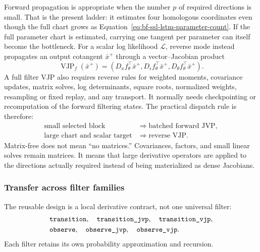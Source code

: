 Forward propagation is appropriate when the number $p$ of required
directions is small.  That is the present ladder: it estimates four homologous
coordinates even though the full chart grows as
Equation~\eqref{eq:bf-ssl-lstm-parameter-count}.  If the full parameter chart
is estimated, carrying one tangent per parameter can itself become the
bottleneck.  For a scalar log likelihood $\mathcal L$, reverse mode instead
propagates an output cotangent $\bar x^+$ through a vector--Jacobian product
\begin{equation}
  \operatorname{VJP}_{f}(\bar x^+)
  =\left(
     D_xf_\theta^\top\bar x^+,
     D_\epsilon f_\theta^\top\bar x^+,
     D_\theta f_\theta^\top\bar x^+
   \right).
  \label{eq:bf-ssl-lstm-transition-vjp}
\end{equation}
A full filter VJP also requires reverse rules for weighted moments, covariance
updates, matrix solves, log determinants, square roots, normalized weights,
resampling or fixed replay, and any transport.  It normally needs
checkpointing or recomputation of the forward filtering states.  The practical
dispatch rule is therefore:
\begin{equation}
  \begin{aligned}
    \text{small selected block}
      &\Rightarrow \text{batched forward JVP},\\
    \text{large chart and scalar target}
      &\Rightarrow \text{reverse VJP}.
  \end{aligned}
  \label{eq:bf-ssl-lstm-jvp-vjp-dispatch}
\end{equation}
Matrix-free does not mean ``no matrices.''  Covariances, factors, and small
linear solves remain matrices.  It means that large derivative operators are
applied to the directions actually required instead of being materialized as
dense Jacobians.

\subsubsection{Transfer across filter families}

The reusable design is a local derivative contract, not one universal filter:
\begin{align*}
  &\texttt{transition},\quad \texttt{transition\_jvp},\quad
    \texttt{transition\_vjp},\\
  &\texttt{observe},\quad \texttt{observe\_jvp},\quad
    \texttt{observe\_vjp}.
\end{align*}
Each filter retains its own probability approximation and recursion.

